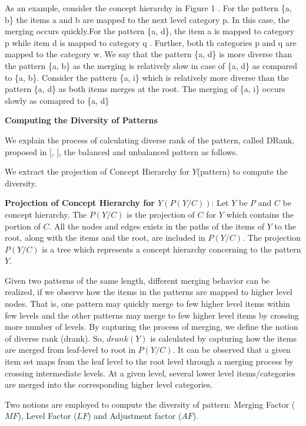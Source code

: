 As an example, consider the concept hierarchy in Figure 1 \iffalse(figure number)\fi. For the pattern \{a, b\} the items a and b are mapped to the next level category p. In this case, the merging occurs quickly.For the pattern \{a, d\}, the item a is mapped to category p while item d is mapped to category q . Further, both th categories p and q are mapped to the category w. We say that the pattern \{a, d\} is more diverse than the pattern \{a, b\} as the merging is relatively slow in case of \{a, d\} as compared to \{a, b\}. Consider the pattern \{a, i\} which is relatively more diverse than the pattern \{a, d\} as both items merges at the root. The merging of \{a, i\} occurs slowly as comapred to \{a, d\}

\textbf{Computing the Diversity of Patterns}

We explain the process of calculating diverse rank of the pattern, called DRank, proposed in [\cite{bib14}, \cite{bib15}], the balanced and unbalanced pattern as follows.

We extract the projection of Concept Hierarchy for $Y$(pattern) to compute the diversity.

\textbf{Projection of Concept Hierarchy for $Y (P (Y /C))$}: Let $Y$ be $P$ and $C$ be concept hierarchy. The $P (Y /C)$ is the projection of $C$ for $Y$ which contains the portion of $C$. 
All the nodes and edges exists in the paths of the items of $Y$ to the root, along with the items and the root, are included in $P (Y /C)$. 
The projection $P (Y /C)$ is a tree which represents a concept hierarchy concerning to the pattern $Y$.

Given two patterns of the same length, different merging behavior can be realized, if we observe how the items in the patterns are mapped to higher level nodes. 
That is, one pattern may quickly merge to few higher level items within few levels and the other patterns may merge to few higher level items by crossing more number of levels. 
By capturing the process of merging, we define the notion of diverse rank (drank). 
So, $drank (Y )$ is calculated by capturing how the items are merged from leaf-level to root in $P (Y/C)$. 
It can be observed that a given item set maps from the leaf level to the root level through a merging process by crossing intermediate levels. 
At a given level, several lower level items/categories are merged into the corresponding higher level categories.

Two notions are employed to compute the diversity of pattern: Merging Factor ($MF$), Level Factor ($LF$) and Adjustment factor ($AF$).

